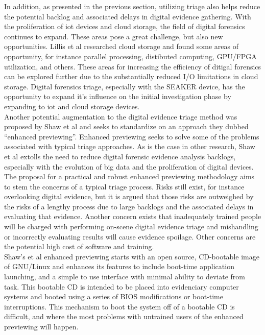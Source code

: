 \documentclass[12pt]{article}
\begin{document}
In addition, as presented in the previous section, utilizing triage also helps
reduce the potential backlog and associated delays in digital evidence gathering.
With the proliferation of \gls{iot} devices and cloud storage, the
field of digital forensics continues to expand.  These areas pose a great challenge,
but also new opportunities.  Lillis et al\cite{lillis2016current} researched cloud
storage and found some areas of opportunity, for instance parallel processing,
distibuted computing, GPU/FPGA utilization, and others.  These areas for increasing
the efficiency of ditigal forensics can be explored further due to the substantially
reduced I/O limitations in cloud storage.  Digital forensics triage, especially with
the SEAKER device, has the opportunity to expand it's influence on the initial
investigation phase by expanding to \gls{iot} and cloud storage devices.\\

Another potential augmentation to the digital evidence triage method was proposed by
Shaw et al\cite{shaw2013practical} and seeks to standardize on an approach they dubbed
``enhanced previewing''.  Enhanced previewing seeks to solve some of the problems
associated with typical triage approaches.  As is the case in other research, Shaw et
al\cite{shaw2013practical} extolls the need to reduce digital forensic evidence
analysis backlogs, especially with the evolution of big data and the proliferation of
digital devices.\\

The proposal for a practical and robust enhanced previewing methodology aims to stem
the concerns of a typical triage process.  Risks still exist, for instance overlooking
digital evidence, but it is argued that those risks are outweighed by the risks of a
lengthy process due to large backlogs and the associated delays in evaluating that
evidence.  Another concern exists that inadequately trained people will be charged
with performing on-scene digital evidence triage and mishandling or incorrectly
evaluating results will cause evidence spoilage. Other concerns are the potential high
cost of software and training\cite{shaw2013practical}.\\

Shaw's et al\cite{shaw2013practical} enhanced previewing starts with an open source,
CD-bootable image of GNU/Linux and enhances its features to include boot-time
application launching, and a simple to use interface with minimal ability to deviate
from task.  This bootable CD is intended to be placed into evidenciary computer
systems and booted using a series of BIOS modifications or boot-time interruptions.
This mechanism to boot the system off of a bootable CD is difficult, and where the
most problems with untrained users of the enhanced previewing will happen.\\
\end{document}
